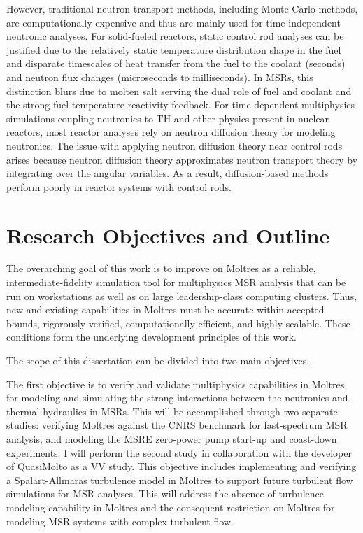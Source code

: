 However, traditional neutron transport methods, including Monte Carlo methods, are computationally expensive
and thus are mainly used for time-independent neutronic analyses. For solid-fueled reactors,
static control rod analyses can be justified due to the relatively static temperature distribution
shape in the fuel and disparate timescales of heat transfer from the fuel to
the coolant (seconds) and neutron flux changes (microseconds to milliseconds). In
\glspl{MSR}, this distinction blurs due to molten salt serving the dual role of fuel and
coolant and the strong fuel temperature reactivity feedback. For time-dependent multiphysics
simulations coupling neutronics to \gls{TH} and other physics present in nuclear reactors, most
reactor analyses rely on neutron diffusion theory for modeling neutronics. The issue with applying
neutron diffusion theory near control rods arises because neutron diffusion theory approximates
neutron transport theory by integrating over the angular variables. As a result, diffusion-based
methods perform poorly in reactor systems with control rods.

\section{Research Objectives and Outline}

The overarching goal of this work is to improve on Moltres as a reliable, intermediate-fidelity
simulation tool for multiphysics \gls{MSR} analysis that can be run on workstations as well as on
large leadership-class computing clusters. Thus, new and existing capabilities in Moltres must
be accurate within accepted bounds, rigorously verified, computationally efficient, and highly
scalable. These conditions form the underlying development principles of this work.

The scope of this dissertation can be divided into two main objectives.

    The first objective is to verify and validate multiphysics capabilities in Moltres for
    modeling and simulating
    the strong interactions between the neutronics and thermal-hydraulics in \glspl{MSR}. This
    will be accomplished through two separate studies: verifying Moltres against the CNRS
    benchmark \cite{tiberga_results_2020} for fast-spectrum \gls{MSR} analysis, and modeling the
    \gls{MSRE} zero-power pump start-up and coast-down experiments. I will perform the second study
    in collaboration with the developer of QuasiMolto \cite{reynolds_analysis_2023} as a \gls{VV}
    study.
    This objective includes implementing and verifying a Spalart-Allmaras turbulence model in
    Moltres to support future turbulent flow
    simulations for \gls{MSR} analyses. This will address the absence of turbulence modeling
    capability in Moltres and the consequent restriction on Moltres for modeling \gls{MSR} systems
    with complex turbulent flow.

